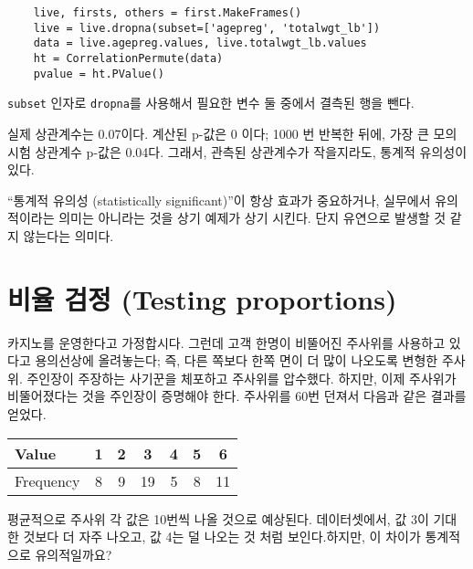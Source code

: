 \begin{verbatim}
    live, firsts, others = first.MakeFrames()
    live = live.dropna(subset=['agepreg', 'totalwgt_lb'])
    data = live.agepreg.values, live.totalwgt_lb.values
    ht = CorrelationPermute(data)
    pvalue = ht.PValue()
\end{verbatim}

{\tt subset} 인자로 {\tt dropna}를 사용해서 필요한 변수 둘 중에서 결측된 행을 뺀다.

실제 상관계수는 0.07이다. 계산된 p-값은 0 이다; 1000 번 반복한 뒤에, 가장 큰 모의 시험 상관계수 p-값은 0.04다. 그래서, 관측된 상관계수가 작을지라도, 통계적 유의성이 있다.

``통계적 유의성 (statistically significant)''이 항상 효과가 중요하거나, 실무에서 유의적이라는 의미는 아니라는 것을 상기 예제가 상기 시킨다.
단지 유연으로 발생할 것 같지 않는다는 의미다.

\section{비율 검정 (Testing proportions)}
\label{casino}

카지노를 운영한다고 가정합시다. 그런데 고객 한명이 비뚤어진 주사위를 사용하고 있다고 용의선상에 올려놓는다; 즉, 다른 쪽보다 한쪽 면이 더 많이 나오도록 변형한 주사위. 주인장이 주장하는 사기꾼을 체포하고 주사위를 압수했다. 하지만, 이제 주사위가 비뚤어졌다는 것을 주인장이 증명해야 한다.
주사위를 60번 던져서 다음과 같은 결과를 얻었다.

\begin{center}
\begin{tabular}{|l|c|c|c|c|c|c|}
\hline
Value     &  1  &  2  &  3  &  4  &  5  &  6  \\ 
\hline
Frequency &  8  &  9  &  19  &  5  &  8  &  11  \\
\hline
\end{tabular}
\end{center}

평균적으로 주사위 각 값은 10번씩 나올 것으로 예상된다.
데이터셋에서, 값 3이 기대한 것보다 더 자주 나오고, 값 4는 덜 나오는 것 처럼 보인다.하지만, 이 차이가 통계적으로 유의적일까요?

